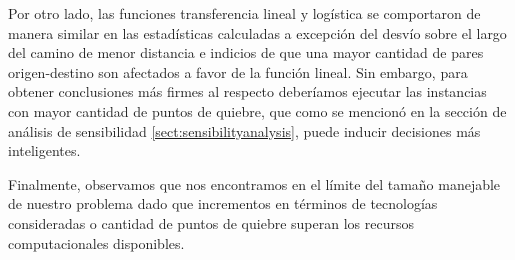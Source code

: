 Por otro lado, las funciones transferencia lineal y logística se comportaron de manera similar en las estadísticas calculadas a excepción del desvío sobre el largo del camino de menor distancia e indicios de que una mayor cantidad de pares origen-destino son afectados a favor de la función lineal. Sin embargo, para obtener conclusiones más firmes al respecto deberíamos ejecutar las instancias con mayor cantidad de puntos de quiebre, que como se mencionó en la sección de análisis de sensibilidad \ref{sect:sensibilityanalysis}, puede inducir decisiones más inteligentes.

Finalmente, observamos que nos encontramos en el límite del tamaño manejable de nuestro problema dado que incrementos en términos de tecnologías consideradas o cantidad de puntos de quiebre superan los recursos computacionales disponibles.

